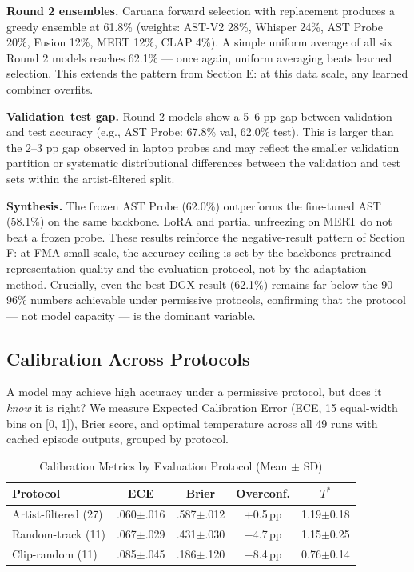 \documentclass[conference]{IEEEtran}
\begin{document}
\textbf{Round 2 ensembles.} Caruana forward selection with replacement
\citep{kittler1998combining} produces a greedy ensemble at 61.8\%
(weights: AST-V2 28\%, Whisper 24\%, AST Probe 20\%, Fusion 12\%, MERT
12\%, CLAP 4\%). A simple uniform average of all six Round 2 models
reaches 62.1\% --- once again, uniform averaging beats learned
selection. This extends the pattern from Section E: at this data scale,
any learned combiner overfits.

\textbf{Validation--test gap.} Round 2 models show a 5--6 pp gap
between validation and test accuracy (e.g., AST Probe: 67.8\% val,
62.0\% test). This is larger than the 2--3 pp gap observed in laptop
probes and may reflect the smaller validation partition or systematic
distributional differences between the validation and test sets within
the artist-filtered split.

\textbf{Synthesis.} The frozen AST Probe (62.0\%) outperforms the
fine-tuned AST (58.1\%) on the same backbone. LoRA and partial
unfreezing on MERT do not beat a frozen probe. These results reinforce
the negative-result pattern of Section F: at FMA-small scale, the
accuracy ceiling is set by the backbone\textquotesingle s pretrained
representation quality and the evaluation protocol, not by the
adaptation method. Crucially, even the best DGX result (62.1\%) remains
far below the 90--96\% numbers achievable under permissive protocols,
confirming that the protocol --- not model capacity --- is the
dominant variable.

\subsection{Calibration Across
Protocols}\label{h.-calibration-across-protocols}

A model may achieve high accuracy under a permissive protocol, but does
it \emph{know} it is right? We measure Expected Calibration Error (ECE,
15 equal-width bins on {[}0, 1{]}), Brier score, and optimal temperature
across all 49 runs with cached episode outputs, grouped by protocol.

\begin{table}[t]
\centering
\caption{Calibration Metrics by Evaluation Protocol (Mean $\pm$ SD)}
\label{tab:calibration}
\footnotesize
\begin{tabular}{lcccc}
\toprule
\textbf{Protocol} & \textbf{ECE} & \textbf{Brier} & \textbf{Overconf.} & \textbf{$T^*$} \\
\midrule
Artist-filtered (27) & .060$\pm$.016 & .587$\pm$.012 & +0.5\,pp & 1.19$\pm$0.18 \\
Random-track (11)    & .067$\pm$.029 & .431$\pm$.030 & $-$4.7\,pp & 1.15$\pm$0.25 \\
Clip-random (11)     & .085$\pm$.045 & .186$\pm$.120 & $-$8.4\,pp & 0.76$\pm$0.14 \\
\bottomrule
\end{tabular}
\end{table}
\end{document}
